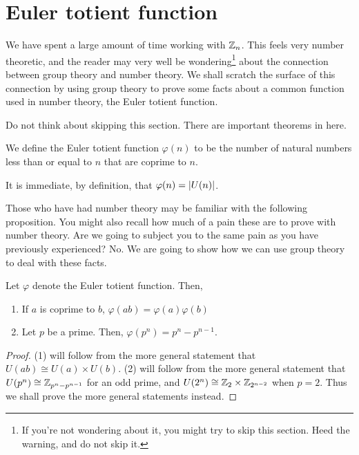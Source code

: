 \documentclass[./algebra-notes.tex]{subfiles}
\begin{document}
\section{Euler totient function}
We have spent a large amount of time working with $\mathbb{Z}_n$. This feels very
number theoretic, and the reader may very well be wondering\footnote{If you're
not wondering about it, you might try to skip this section. Heed the warning,
and do not skip it.} about the connection between group theory and number
theory. We shall scratch the surface of this connection by using group theory to
prove some facts about a common function used in number theory, the Euler
totient function.
\begin{warning}
Do not think about skipping this section. There are important theorems in here.
\end{warning}
\begin{definition}
    We define the Euler totient function $\varphi(n)$ to be the number of
    natural numbers less than or equal to $n$ that are coprime to $n$.
\end{definition}
It is immediate, by definition, that $\varphi(n) = \abs{U(n)}$. 

Those who have had number theory may be familiar with the following proposition.
You might also recall how much of a pain these are to prove with number theory.
Are we going to subject you to the same pain as you have previously experienced? 
No. We are going to show how we can use group theory to deal with these facts.
\begin{proposition}
    Let $\varphi$ denote the Euler totient function. Then, 

    \begin{enumerate}
        \item If $a$ is coprime to $b$, $\varphi(ab) = \varphi(a) \varphi(b)$
        \item Let $p$ be a prime. Then, $\varphi(p^n) = p^n - p^{n-1}$.
    \end{enumerate}
\end{proposition}
\begin{proof}
    (1) will follow from the more general statement that $U(ab) \cong U(a)
    \times U(b)$. (2) will follow from the more general statement that $U(p^n)
    \cong \mathbb{Z}_{p^n - p^{n-1}}$ for an odd prime, and $U(2^n) \cong \mathbb{Z}_2 \times
    \mathbb{Z}_{2^{n-2}}$ when $p=2$. Thus we shall prove the more general statements
    instead.
\end{proof}
\end{document}
